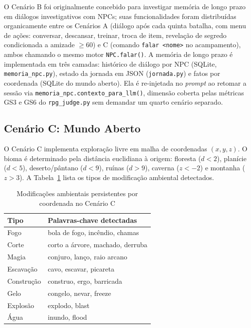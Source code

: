 \documentclass[12pt]{article}
\begin{document}
O Cenário B foi originalmente concebido para investigar memória de longo prazo em diálogos investigativos com NPCs; suas funcionalidades foram distribuídas organicamente entre os Cenários A (diálogo após cada quinta batalha, com menu de ações: conversar, descansar, treinar, troca de item, revelação de segredo condicionada a amizade $\geq 60$) e C (comando \texttt{falar~<nome>} no acampamento), ambos chamando o mesmo motor \texttt{NPC.falar()}. A memória de longo prazo é implementada em três camadas: histórico de diálogo por NPC (SQLite, \texttt{memoria\_npc.py}), estado da jornada em JSON (\texttt{jornada.py}) e fatos por coordenada (SQLite do mundo aberto). Ela é re-injetada no \textit{prompt} ao retomar a sessão via \texttt{memoria\_npc.contexto\_para\_llm()}, dimensão coberta pelas métricas GS3 e GS6 do \texttt{rpg\_judge.py} sem demandar um quarto cenário separado.

\subsection{Cenário C: Mundo Aberto}

O Cenário C implementa exploração livre em malha de coordenadas $(x,y,z)$. O bioma é determinado pela distância euclidiana à origem: floresta ($d<2$), planície ($d<5$), deserto/pântano ($d<9$), ruínas ($d>9$), caverna ($z<-2$) e montanha ($z>3$). A Tabela~\ref{tab:modificacoes} lista os tipos de modificação ambiental detectados.

\begin{table}[ht]
\centering
\caption{Modificações ambientais persistentes por coordenada no Cenário C}
\label{tab:modificacoes}
\begin{tabular}{ll}
\toprule
\textbf{Tipo} & \textbf{Palavras-chave detectadas} \\
\midrule
Fogo       & bola de fogo, incêndio, chamas \\
Corte      & corto a árvore, machado, derruba \\
Magia      & conjuro, lanço, raio arcano \\
Escavação  & cavo, escavar, picareta \\
Construção & construo, ergo, barricada \\
Gelo       & congelo, nevar, freeze \\
Explosão   & explodo, blast \\
Água       & inundo, flood \\
\bottomrule
\end{tabular}
\end{table}
\end{document}
